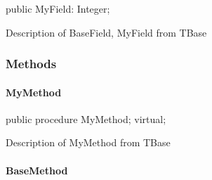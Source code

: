 \documentclass{report}
\begin{document}
\begin{list}{}{
\setlength{\itemindent}{0cm}
\setlength{\listparindent}{0cm}
\setlength{\leftmargin}{\evensidemargin}
\addtolength{\leftmargin}{\tmplength}
\settowidth{\labelsep}{X}
\addtolength{\leftmargin}{\labelsep}
\setlength{\labelwidth}{\tmplength}
}
\begin{flushleft}
\item[\textbf{Declaration}\hfill]
\begin{ttfamily}
public MyField: Integer;\end{ttfamily}


\end{flushleft}
\par
\item[\textbf{Description}]
Description of BaseField, MyField from TBase

\end{list}
\subsubsection*{\large{\textbf{Methods}}\normalsize\hspace{1ex}\hfill}
\paragraph*{MyMethod}\hspace*{\fill}

\begin{list}{}{
\setlength{\itemindent}{0cm}
\setlength{\listparindent}{0cm}
\setlength{\leftmargin}{\evensidemargin}
\addtolength{\leftmargin}{\tmplength}
\settowidth{\labelsep}{X}
\addtolength{\leftmargin}{\labelsep}
\setlength{\labelwidth}{\tmplength}
}
\begin{flushleft}
\item[\textbf{Declaration}\hfill]
\begin{ttfamily}
public procedure MyMethod; virtual;\end{ttfamily}


\end{flushleft}
\par
\item[\textbf{Description}]
Description of MyMethod from TBase

\end{list}
\paragraph*{BaseMethod}\hspace*{\fill}
\end{document}
